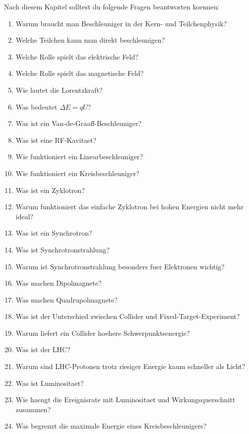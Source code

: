 \begin{examtipbox}
Nach diesem Kapitel solltest du folgende Fragen beantworten koennen:
\begin{enumerate}
    \item Warum braucht man Beschleuniger in der Kern- und Teilchenphysik?
    \item Welche Teilchen kann man direkt beschleunigen?
    \item Welche Rolle spielt das elektrische Feld?
    \item Welche Rolle spielt das magnetische Feld?
    \item Wie lautet die Lorentzkraft?
    \item Was bedeutet $\Delta E=qU$?
    \item Was ist ein Van-de-Graaff-Beschleuniger?
    \item Was ist eine RF-Kavitaet?
    \item Wie funktioniert ein Linearbeschleuniger?
    \item Wie funktioniert ein Kreisbeschleuniger?
    \item Was ist ein Zyklotron?
    \item Warum funktioniert das einfache Zyklotron bei hohen Energien nicht mehr ideal?
    \item Was ist ein Synchrotron?
    \item Was ist Synchrotronstrahlung?
    \item Warum ist Synchrotronstrahlung besonders fuer Elektronen wichtig?
    \item Was machen Dipolmagnete?
    \item Was machen Quadrupolmagnete?
    \item Was ist der Unterschied zwischen Collider und Fixed-Target-Experiment?
    \item Warum liefert ein Collider hoehere Schwerpunktsenergie?
    \item Was ist der LHC?
    \item Warum sind LHC-Protonen trotz riesiger Energie kaum schneller als Licht?
    \item Was ist Luminositaet?
    \item Wie haengt die Ereignisrate mit Luminositaet und Wirkungsquerschnitt zusammen?
    \item Was begrenzt die maximale Energie eines Kreisbeschleunigers?
\end{enumerate}
\end{examtipbox}